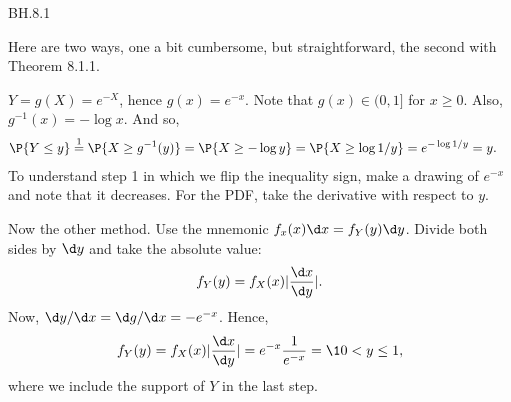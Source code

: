 
\setcounter{theorem}{0}
\begin{exercise} BH.8.1
\begin{solution}
Here are two ways, one a bit cumbersome, but straightforward, the second with Theorem 8.1.1.

$Y=g(X) = e^{-X}$, hence $g(x) = e^{-x}$. Note that $g(x) \in (0, 1]$ for $x\geq 0$. Also, $g^{-1}(x) = -\log x$. And so,
\begin{align*}
  \P{Y\leq y} &\stackrel1= \P{X \geq g^{-1}(y)} = \P{X \geq -\log y} = \P{X\geq \log 1/y} = e^{-\log 1/y} =  y.
\end{align*}
To understand step 1 in which we flip the inequality sign, make a drawing of $e^{-x}$ and note that it decreases.
For the PDF, take the derivative with respect to $y$.

Now the other method. Use the mnemonic $f_{x}(x) \d x = f_{Y}(y) \d y$. Divide both sides by $\d y$ and take the absolute value:
\begin{align*}
  f_{Y}(y) = f_{X}(x) |\frac{\d x}{\d y}|.
\end{align*}
Now, $\d y/\d x = \d g/\d x = -e^{-x}$. Hence,
\begin{align*}
  f_{Y}(y) = f_{X}(x) |\frac{\d x}{\d y}| = e^{-x} \frac{1}{e^{-x}} = \1 {0< y \leq 1},
\end{align*}
where we include the support of $Y$ in the last step.

\end{solution}
\end{exercise}

